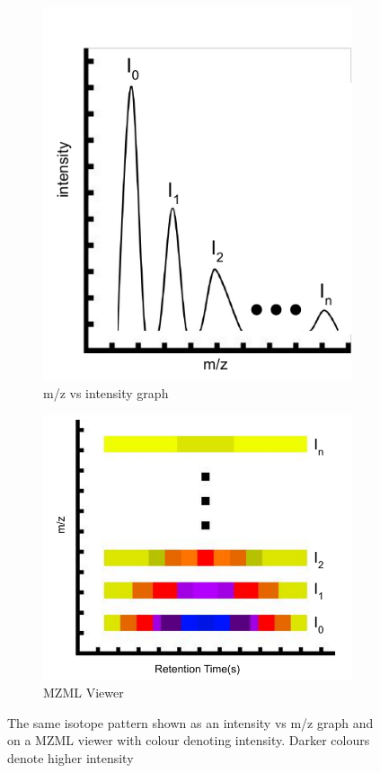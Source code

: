 \documentclass{l4proj}
\begin{document}
\begin{figure}[htb]
    \centering
    \begin{subfigure}{0.36\linewidth}
        \includegraphics[width=\linewidth]{dissertation/images/intensities_new_1.pdf}
    \caption{m/z vs intensity graph}
    \end{subfigure}
    \begin{subfigure}{0.5\linewidth}
        \includegraphics[width=\linewidth]{dissertation/images/spectrum graph.pdf}
    \caption{MZML Viewer}
    \end{subfigure}
    \caption{The same isotope pattern shown as an intensity vs m/z graph and on a MZML viewer with colour denoting intensity. Darker colours denote higher intensity}
    \label{fig:mzml-viewer}
\end{figure}
\end{document}
